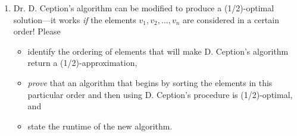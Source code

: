 \documentclass[12 pt, letterpaper]{hmcpset}
\begin{document}
\begin{problem}
\begin{enumerate}
    \item Dr. D. Ception's algorithm can be modified to produce a (1/2)-optimal solution---it works \emph{if} the elements $v_1, v_2, \dots, v_n$ are considered in a certain order! Please
    \begin{itemize}
        \item identify the ordering of elements that will make D. Ception's algorithm return a (1/2)-approximation,
        \item \emph{prove} that an algorithm that begins by sorting the elements in this particular order and then using D. Ception's procedure is (1/2)-optimal, and
        \item state the runtime of the new algorithm.
    \end{itemize}
\end{enumerate}
\end{problem}
\end{document}
